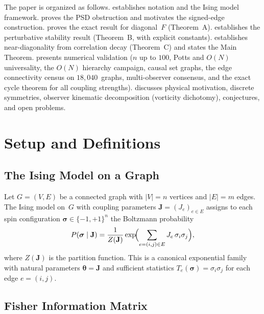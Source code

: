 \documentclass[11pt]{article}
\theoremstyle{definition}
\theoremstyle{remark}
\begin{document}
The paper is organized as follows.
 establishes notation and the Ising model framework.
 proves the PSD obstruction and motivates the signed-edge
construction.
 proves the exact result for diagonal~$F$ (Theorem~A).
 establishes the perturbative stability result
(Theorem~B, with explicit constants).
 establishes near-diagonality from correlation decay
(Theorem~C) and states the Main Theorem.
 presents numerical validation ($n$ up to $100$, Potts
and $O(N)$ universality, the $O(N)$ hierarchy campaign, causal set graphs,
the edge connectivity census on $18{,}040$~graphs, multi-observer consensus,
and the exact cycle theorem for all coupling strengths).
 discusses physical motivation, discrete symmetries,
observer kinematic decomposition (vorticity dichotomy), conjectures, and
open problems.


\section{Setup and Definitions}
\label{sec:setup}

\subsection{The Ising Model on a Graph}

Let $G = (V, E)$ be a connected graph with $|V| = n$ vertices and $|E| = m$
edges. The Ising model on~$G$ with coupling parameters
$\mathbf{J} = (J_e)_{e \in E}$ assigns to each spin configuration
$\boldsymbol{\sigma} \in \{-1, +1\}^n$ the Boltzmann probability
\begin{equation}
  P(\boldsymbol{\sigma} \mid \mathbf{J})
  = \frac{1}{Z(\mathbf{J})} \exp\!\Bigl(
    \sum_{e = (i,j) \in E} J_e \, \sigma_i \sigma_j
  \Bigr),
  \label{eq:ising}
\end{equation}
where $Z(\mathbf{J})$ is the partition function. This is a canonical
exponential family with natural parameters $\boldsymbol{\theta} = \mathbf{J}$
and sufficient statistics $T_e(\boldsymbol{\sigma}) = \sigma_i \sigma_j$ for
each edge $e = (i,j)$.

\subsection{Fisher Information Matrix}
\end{document}
